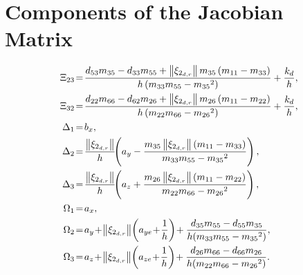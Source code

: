 \section{Components of the Jacobian Matrix}
\label{app:jacobian}
\begin{subequations}
    \begin{align}
        \Xi_{23}\! &= \!\frac{d_{53}m_{35} - d_{33}m_{55} + \norm{\xi_{2_{d,r}}}m_{35}\left(m_{11}-m_{33}\right)}{h\left(m_{33}m_{55}-{m_{35}}^2\right)} + \frac{k_{d}}{h}, \\
        \Xi_{32}\! &= \!\frac{d_{22}m_{66} - d_{62}m_{26} + \norm{\xi_{2_{d,r}}}m_{26}\left(m_{11}-m_{22}\right)}{h\left(m_{22}m_{66}-{m_{26}}^2\right)} + \frac{k_{d}}{h}, \\
        \Delta_1\! &= \!b_x, \\
        \Delta_2\! &= \!\frac{\norm{\xi_{2_{d,r}}}}{h}\!\!\left(a_y-\frac{m_{35}\norm{\xi_{2_{d,r}}}\left(m_{11}-m_{33}\right)}{m_{33}m_{55}-{m_{35}}^2}\right), \\
        \Delta_3\! &= \!\frac{\norm{\xi_{2_{d,r}}}}{h}\!\!\left(a_z+\frac{m_{26}\norm{\xi_{2_{d,r}}}\left(m_{11}-m_{22}\right)}{m_{22}m_{66}-{m_{26}}^2}\right), \\
        \Omega_1\! &= \!a_x, \\
        \Omega_2\! &= \!a_y \!+\! \norm{\xi_{2_{d,r}}}\!\left(a_{ye} \!+\! \frac{1}{h}\right)\! + \frac{d_{35}m_{55}-d_{55}m_{35}}{h\!\left(m_{33}m_{55}-{m_{35}}^2\right)}, \\
        \Omega_3\! &= \!a_z \!+\! \norm{\xi_{2_{d,r}}}\!\left(a_{ze} \!+\! \frac{1}{h}\right)\! + \frac{d_{26}m_{66}-d_{66}m_{26}}{h\!\left(m_{22}m_{66}-{m_{26}}^2\right)}.
    \end{align}
\end{subequations}
